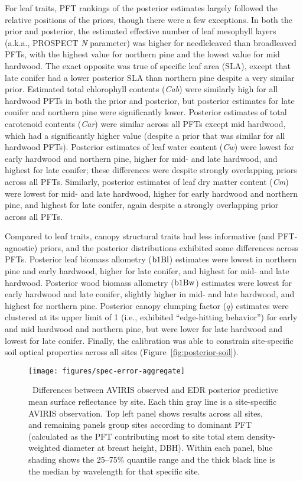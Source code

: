 For leaf traits, PFT rankings of the posterior estimates largely followed the relative positions of the priors, though there were a few exceptions.
In both the prior and posterior, the estimated effective number of leaf mesophyll layers (a.k.a., PROSPECT \emph{N} parameter) was higher for needleleaved than broadleaved PFTs, with the highest value for northern pine and the lowest value for mid hardwood.
The exact opposite was true of specific leaf area (SLA), except that late conifer had a lower posterior SLA than northern pine despite a very similar prior.
Estimated total chlorophyll contents (\emph{Cab}) were similarly high for all hardwood PFTs in both the prior and posterior,
but posterior estimates for late conifer and northern pine were significantly lower.
Posterior estimates of total carotenoid contents (\emph{Car}) were similar across all PFTs except mid hardwood, which had a significantly higher value (despite a prior that was similar for all hardwood PFTs).
Posterior estimates of leaf water content (\emph{Cw}) were lowest for early hardwood and northern pine, higher for mid- and late hardwood, and highest for late conifer; these differences were despite strongly overlapping priors across all PFTs.
Similarly, posterior estimates of leaf dry matter content (\emph{Cm}) were lowest for mid- and late hardwood, higher for early hardwood and northern pine, and highest for late conifer, again despite a strongly overlapping prior across all PFTs.

Compared to leaf traits, canopy structural traits had less informative (and PFT-agnostic) priors, and the posterior distributions exhibited some differences across PFTs.
Posterior leaf biomass allometry ($\mathrm{b1Bl}$) estimates were lowest in northern pine and early hardwood, higher for late conifer, and highest for mid- and late hardwood.
Posterior wood biomass allometry ($\mathrm{b1Bw}$) estimates were lowest for early hardwood and late conifer, slightly higher in mid- and late hardwood, and highest for northern pine.
Posterior canopy clumping factor ($q$) estimates were clustered at its upper limit of 1 (i.e., exhibited ``edge-hitting behavior'') for early and mid hardwood and northern pine, but were lower for late hardwood and lowest for late conifer.
Finally, the calibration was able to constrain site-specific soil optical properties across all sites (Figure~\ref{fig:posterior-soil}).

\begin{figure}
  \centering
  \texttt{[image: figures/spec-error-aggregate]}
  \caption{\label{fig:spec-error-aggregate}\
    Differences between AVIRIS observed and EDR posterior predictive mean surface reflectance by site.
    Each thin gray line is a site-specific AVIRIS observation.
    Top left panel shows results across all sites,
    and remaining panels group sites according to dominant PFT (calculated as the PFT contributing most to site total stem density-weighted diameter at breast height, DBH).
    Within each panel, blue shading shows the 25--75\% quantile range and the thick black line is the median by wavelength for that specific site.
  }
\end{figure}

